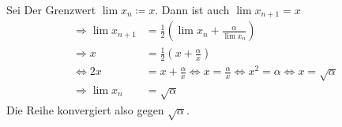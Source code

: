 \begin{lsg}
Sei Der Grenzwert $\lim x_n \coloneqq x$. Dann ist auch $\lim x_{n+1} = x$
\begin{align*}
    \Rightarrow \lim x_{n+1} &= \frac12 \left(\lim x_n + \frac{\alpha}{\lim x_n}\right) \\
    \Rightarrow x &= \frac12 \left(x + \frac{\alpha}{x}\right) \\
    \Leftrightarrow 2x &= x + \frac{\alpha}{x} \Leftrightarrow x = \frac{\alpha}{x} \Leftrightarrow x^2 = \alpha \Leftrightarrow x = \sqrt{\alpha} \\
    \Rightarrow \lim x_n &= \sqrt{\alpha}
\end{align*}
Die Reihe konvergiert also gegen $\sqrt{\alpha}$.
\end{lsg}